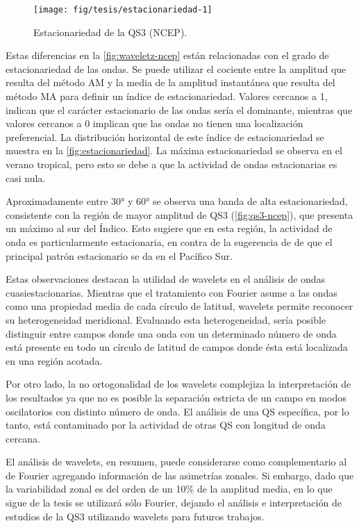 \documentclass[spanish,a4paper,12pt,oneside]{book}
\begin{document}
\begin{figure}
\texttt{[image: fig/tesis/estacionariedad-1]} \caption{Estacionariedad de la QS3 (NCEP).}\label{fig:estacionariedad}
\end{figure}

Estas diferencias en la \autoref{fig:waveletz-ncep} están relacionadas
con el grado de estacionariedad de las ondas. Se puede utilizar el
cociente entre la amplitud que resulta del método AM y la media de la
amplitud instantánea que resulta del método MA para definir un índice de
estacionariedad. Valores cercanos a 1, indican que el carácter
estacionario de las ondas sería el dominante, mientras que valores
cercanos a 0 implican que las ondas no tienen una localización
preferencial. La distribución horizontal de este índice de
estacionariedad se muestra en la \autoref{fig:estacionariedad}. La
máxima estacionariedad se observa en el verano tropical, pero esto se
debe a que la actividad de ondas estacionarias es casi nula.

Aproximadamente entre 30° y 60° se observa una banda de alta
estacionariedad, consistente con la región de mayor amplitud de QS3
(\autoref{fig:qs3-ncep}), que presenta un máximo al sur del Índico. Esto
sugiere que en esta región, la actividad de onda es particularmente
estacionaria, en contra de la sugerencia de \citet{Hobbs2010} de que el
principal patrón estacionario se da en el Pacífico Sur.

Estas observaciones destacan la utilidad de wavelets en el análisis de
ondas cuasiestacionarias. Mientras que el tratamiento con Fourier asume
a las ondas como una propiedad media de cada círculo de latitud,
wavelets permite reconocer su heterogeneidad meridional. Evaluando esta
heterogeneidad, sería posible distinguir entre campos donde una onda con
un determinado número de onda está presente en todo un círculo de
latitud de campos donde ésta está localizada en una región acotada.

Por otro lado, la no ortogonalidad de los wavelets complejiza la
interpretación de los resultados ya que no es posible la separación
estricta de un campo en modos oscilatorios con distinto número de onda.
El análisis de una QS específica, por lo tanto, está contaminado por la
actividad de otras QS con longitud de onda cercana.

El análisis de wavelets, en resumen, puede considerarse como
complementario al de Fourier agregando información de las asimetrías
zonales. Si embargo, dado que la variabilidad zonal es del orden de un
10\% de la amplitud media, en lo que sigue de la tesis se utilizará sólo
Fourier, dejando el análisis e interpretación de estudios de la QS3
utilizando wavelets para futuros trabajos.
\end{document}
